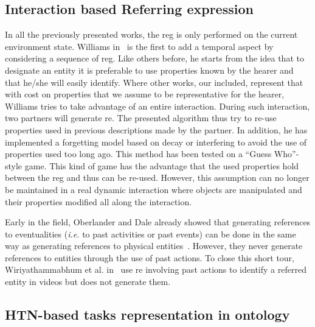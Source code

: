 \subsection{Interaction based Referring expression}

In all the previously presented works, the \acrshort{reg} is only performed on the current environment state. Williams in~\cite{williams_2020_toward} is the first to add a temporal aspect by considering a sequence of \acrshort{reg}. Like others before, he starts from the idea that to designate an entity it is preferable to use properties known by the hearer and that he/she will easily identify. Where other works, our included, represent that with cost on properties that we assume to be representative for the hearer, Williams tries to take advantage of an entire interaction. During such interaction, two partners will generate \acrshort{re}. The presented algorithm thus try to re-use properties used in previous descriptions made by the partner. In addition, he has implemented a forgetting model based on decay or interfering to avoid the use of properties used too long ago. This method has been tested on a ``Guess Who''-style game. This kind of game has the advantage that the used properties hold between the \acrshort{reg} and thus can be re-used. However, this assumption can no longer be maintained in a real dynamic interaction where objects are manipulated and their properties modified all along the interaction.

Early in the field, Oberlander and Dale already showed that generating references to eventualities (\textit{i.e.} to past activities or past events) can be done in the same way as generating references to physical entities~\cite{oberlander_1991_generating}. However, they never generate references to entities through the use of past actions. To close this short tour, Wiriyathammabhum et al. in~\cite{wiriyathammabhum_2019_referring} use \acrshort{re} involving past actions to identify a referred entity in videos but does not generate them.


\subsection{HTN-based tasks representation in ontology}

